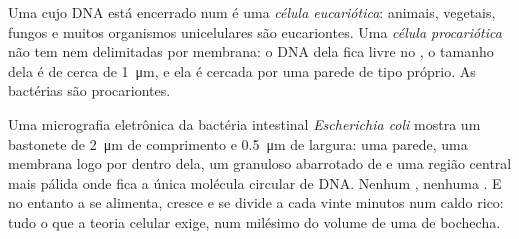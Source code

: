 \begin{definition}\label{def:g10:cells-common-unit:prokaryote}
Uma  cujo DNA está encerrado num  é uma
\emph{célula eucariótica}: animais, vegetais,
fungos e muitos organismos unicelulares são eucariontes. Uma
\emph{célula procariótica} não tem 
nem  delimitadas por membrana: o DNA dela fica livre no
, o tamanho dela é de cerca de \qty{1}{\micro m}, e ela é
cercada por uma parede de tipo próprio. As bactérias são procariontes.
\end{definition}

\begin{example}\label{ex:g10:cells-common-unit:bacterium}
Uma micrografia eletrônica da bactéria intestinal \emph{Escherichia
coli} mostra um bastonete de \qty{2}{\micro m} de comprimento e
\qty{0.5}{\micro m} de largura: uma parede, uma membrana logo por
dentro dela, um  granuloso abarrotado de  e uma
região central mais pálida onde fica a única molécula circular de DNA.
Nenhum , nenhuma . E no entanto a  se alimenta,
cresce e se divide a cada vinte minutos num caldo rico: tudo o que a
teoria celular exige, num milésimo do volume de uma  de bochecha.
\end{example}

